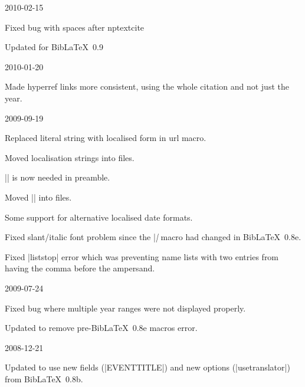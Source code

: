 \documentclass{ltxdockit}
\begin{document}
\begin{changelog}
\begin{release}{0.8}{2010-02-15}
\item Fixed bug with spaces after nptextcite
\item Updated for Bib\LaTeX\ 0.9
\end{release}

\begin{release}{0.7}{2010-01-20}
\item Made hyperref links more consistent, using the whole citation and not
  just the year.
\end{release}


\begin{release}{0.5}{2009-09-19}
\item Replaced literal string with localised form in url macro.
\item Moved localisation strings into  files.
\item |\DeclareLanguageMapping| is now needed in preamble.
\item Moved |\DeclareBibliographyExtras| into  files.
\item Some support for alternative localised date formats.
\item Fixed slant/italic font problem since the |\mkbibemph| macro had
  changed in Bib\LaTeX\ 0.8e.
\item Fixed |liststop| error which was preventing name lists with two
  entries from having the comma before the ampersand.
\end{release}

\begin{release}{0.4}{2009-07-24}
\item Fixed bug where multiple year ranges were not displayed properly.
\item Updated to remove pre-Bib\LaTeX\ 0.8e macros error.
\end{release}

\begin{release}{0.3}{2008-12-21}
\item Updated to use new fields (|EVENTTITLE|) and new options
  (|usetranslator|) from Bib\LaTeX\ 0.8b.
\end{release}


\end{changelog}
\end{document}
